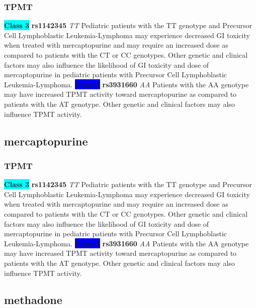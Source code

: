 \documentclass{book}
\begin{document}
\subsubsection{ TPMT }

\begin{center}
\textbf{\colorbox{cyan} {Class 3}} \textbf{ rs1142345 } \textit{ TT }
Pediatric patients with the TT genotype and Precursor Cell Lymphoblastic Leukemia-Lymphoma may experience decreased GI toxicity when treated with mercaptopurine and may require an increased dose as compared to patients with the CT or CC genotypes. Other genetic and clinical factors may also influence the likelihood of GI toxicity and dose of mercaptopurine in pediatric patients with Precursor Cell Lymphoblastic Leukemia-Lymphoma.
\textbf{\colorbox{blue} {Class 4}} \textbf{ rs3931660 } \textit{ AA }
Patients with the AA genotype may have increased TPMT activity toward mercaptopurine as compared to patients with the AT genotype. Other genetic and clinical factors may also influence TPMT activity. 

\end{center}\subsection{ mercaptopurine }


\subsubsection{ TPMT }

\begin{center}
\textbf{\colorbox{cyan} {Class 3}} \textbf{ rs1142345 } \textit{ TT }
Pediatric patients with the TT genotype and Precursor Cell Lymphoblastic Leukemia-Lymphoma may experience decreased GI toxicity when treated with mercaptopurine and may require an increased dose as compared to patients with the CT or CC genotypes. Other genetic and clinical factors may also influence the likelihood of GI toxicity and dose of mercaptopurine in pediatric patients with Precursor Cell Lymphoblastic Leukemia-Lymphoma.
\textbf{\colorbox{blue} {Class 4}} \textbf{ rs3931660 } \textit{ AA }
Patients with the AA genotype may have increased TPMT activity toward mercaptopurine as compared to patients with the AT genotype. Other genetic and clinical factors may also influence TPMT activity. 

\end{center}\subsection{ methadone }
\end{document}
